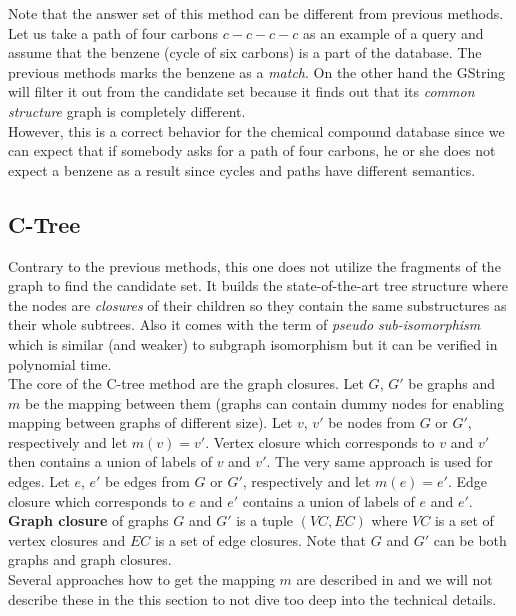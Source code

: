Note that the answer set of this method can be different from previous methods. Let us take a path of four carbons $ c-c-c-c $ as an example of a query and assume that the benzene (cycle of six carbons) is a part of the database. The previous methods marks the benzene as a \textit{match}. On the other hand the GString will filter it out from the candidate set because it finds out that its \textit{common structure} graph is completely different.\\

However, this is a correct behavior for the chemical compound database since we can expect that if somebody asks for a path of four carbons, he or she does not expect a benzene as a result since cycles and paths have different semantics.

\subsection{C-Tree}

Contrary to the previous methods, this one does not utilize the fragments of the graph to find the candidate set. It builds the state-of-the-art tree structure where the nodes are \textit{closures} of their children so they contain the same substructures as their whole subtrees. Also it comes with the term of \textit{pseudo sub-isomorphism} which is similar (and weaker) to subgraph isomorphism but it can be verified in polynomial time.\\

The core of the C-tree method are the graph closures. Let $ G $, $ G' $ be graphs and $ m $ be the mapping between them (graphs can contain dummy nodes for enabling mapping between graphs of different size). Let $ v $, $ v' $ be nodes from $ G $ or $ G' $, respectively and let $ m(v) = v' $. Vertex closure which corresponds to $ v $ and $ v' $ then contains a union of labels of $ v $ and $ v' $. The very same approach is used for edges.  Let $ e $, $ e' $ be edges from $ G $ or $ G' $, respectively and let $ m(e) = e' $. Edge closure which corresponds to $ e $ and $ e' $ contains a union of labels of $ e $ and $ e' $. \textbf{Graph closure} of graphs $ G $ and $ G' $ is a tuple $ (VC, EC) $ where $ VC $ is a set of vertex closures and $ EC $ is a set of edge closures. Note that $ G $ and $ G' $ can be both graphs and graph closures.\\

Several approaches how to get the mapping $m$ are described in \cite{CTree} and we will not describe these in the this section to not dive too deep into the technical details.\\

